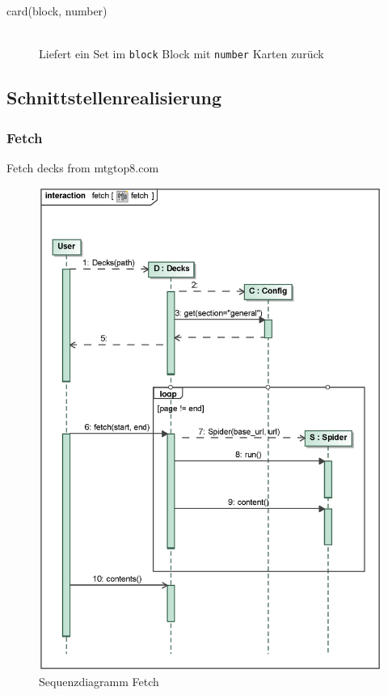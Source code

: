 \begin{description}
    \item[card(block, number)] \hfill \\
    Liefert ein Set im \verb|block| Block mit \verb|number| Karten zurück
\end{description}


\subsection{Schnittstellenrealisierung}
%
%
\subsubsection{Fetch} %
Fetch decks from mtgtop8.com  %

\begin{figure}[H]
    \myfloatalign
    \includegraphics[width=\textwidth]{gfx/MtGDeepAnalysis/fetch.eps}
    \caption{Sequenzdiagramm Fetch} %
    \label{fig:seq:fetch}
\end{figure}

